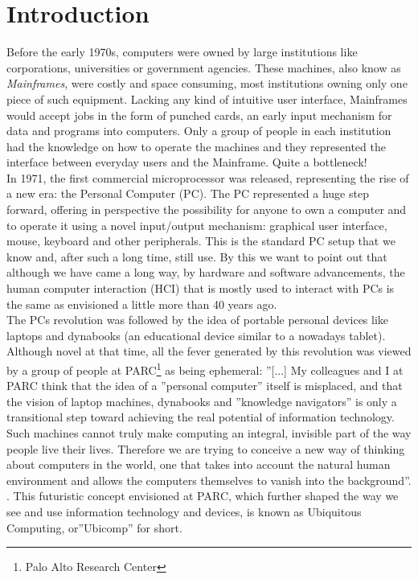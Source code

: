 \chapter{Introduction}\label{ch:introduction}

Before the early 1970s, computers were owned by large institutions like corporations, universities or government agencies. These machines, also know as \emph{Mainframes}, were costly and space consuming, most institutions owning only one piece of such equipment. Lacking any kind of intuitive user interface, Mainframes would accept jobs in the form of punched cards, an early input mechanism for data and programs into computers. Only a group of people in each institution had the knowledge on how to operate the machines and they represented the interface between everyday users and the Mainframe. Quite a bottleneck!\\

In 1971, the first commercial microprocessor was released, representing the rise of a new era: the Personal Computer (PC). The PC represented a huge step forward, offering in perspective the possibility for anyone to own a computer and to operate it using a novel input/output mechanism: graphical user interface, mouse, keyboard and other peripherals. This is the standard PC setup that we know and, after such a long time, still use. By this we want to point out that although we have came a long way, by hardware and software advancements, the human computer interaction (HCI) that is mostly used to interact with PCs is the same as envisioned a little more than 40 years ago.\\

The PCs revolution was followed by the idea of portable personal devices like laptops and dynabooks (an educational device similar to a nowadays tablet). Although novel at that time, all the fever generated by this revolution was viewed by a group of people at PARC\footnote{Palo Alto Research Center} as being ephemeral: ''[...] My colleagues and I at PARC think that the idea of a ''personal computer'' itself is misplaced, and that the vision of laptop machines, dynabooks and ''knowledge navigators'' is only a transitional step toward achieving the real potential of information technology. Such machines cannot truly make computing an integral, invisible part of the way people live their lives. Therefore we are trying to conceive a new way of thinking about computers in the world, one that takes into account the natural human environment and allows the computers themselves to vanish into the background''. \cite{weiser1991computer}. This futuristic concept envisioned at PARC, which further shaped the way we see and use information technology and devices, is known as Ubiquitous Computing, or''Ubicomp'' for short.\\

